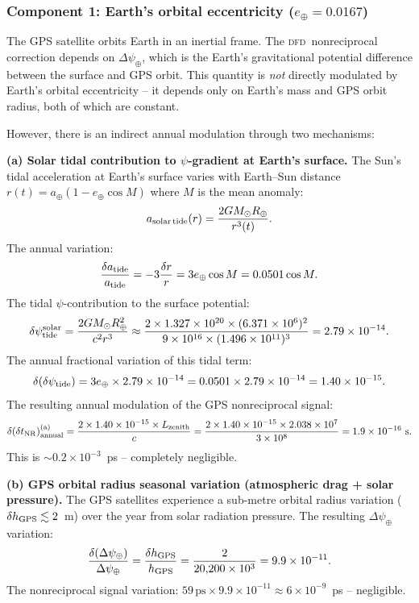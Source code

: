 \documentclass[aps,prd,twocolumn,superscriptaddress,nofootinbib,longbibliography]{revtex4-2}
\newcommand{\DFD}{\textsc{dfd}}
\begin{document}
\subsubsection{Component 1: Earth's orbital eccentricity ($e_\oplus = 0.0167$)}

The GPS satellite orbits Earth in an inertial frame.  The \DFD\ nonreciprocal
correction depends on $\Delta\psi_\oplus$, which is the Earth's gravitational
potential difference between the surface and GPS orbit.  This quantity is
\emph{not} directly modulated by Earth's orbital eccentricity -- it depends
only on Earth's mass and GPS orbit radius, both of which are constant.

However, there is an indirect annual modulation through two mechanisms:

\textbf{(a) Solar tidal contribution to $\psi$-gradient at Earth's surface.}
The Sun's tidal acceleration at Earth's surface varies with Earth--Sun distance
$r(t) = a_\oplus(1 - e_\oplus\cos M)$ where $M$ is the mean anomaly:
\begin{equation}
a_{\rm solar\,tide}(r) = \frac{2GM_\odot R_\oplus}{r^3(t)}.
\end{equation}
The annual variation:
\begin{equation}
\frac{\delta a_{\rm tide}}{a_{\rm tide}} = -3\frac{\delta r}{r} = 3e_\oplus\cos M
= 0.0501\cos M.
\end{equation}
The tidal $\psi$-contribution to the surface potential:
\begin{equation}
\delta\psi_{\rm tide}^{\rm solar} = \frac{2GM_\odot R_\oplus^2}{c^2 r^3}
\approx \frac{2\times1.327\times10^{20}\times(6.371\times10^6)^2}
{9\times10^{16}\times(1.496\times10^{11})^3}
= 2.79\times10^{-14}.
\end{equation}
The annual fractional variation of this tidal term:
\begin{equation}
\delta(\delta\psi_{\rm tide}) = 3e_\oplus \times 2.79\times10^{-14}
= 0.0501\times2.79\times10^{-14} = 1.40\times10^{-15}.
\end{equation}
The resulting annual modulation of the GPS nonreciprocal signal:
\begin{equation}
\delta(\delta t_{\rm NR})_{\rm annual}^{\rm (a)}
= \frac{2\times1.40\times10^{-15}\times L_{\rm zenith}}{c}
= \frac{2\times1.40\times10^{-15}\times2.038\times10^7}{3\times10^8}
= 1.9\times10^{-16}\ \si{s}.
\end{equation}
This is $\sim 0.2\times10^{-3}$~ps -- completely negligible.

\textbf{(b) GPS orbital radius seasonal variation (atmospheric drag + solar pressure).}
The GPS satellites experience a sub-metre orbital radius variation
($\delta h_{\rm GPS}\lesssim 2$~m) over the year from solar radiation pressure.
The resulting $\Delta\psi_\oplus$ variation:
\begin{equation}
\frac{\delta(\Delta\psi_\oplus)}{\Delta\psi_\oplus}
= \frac{\delta h_{\rm GPS}}{h_{\rm GPS}} = \frac{2}{20{,}200\times10^3}
= 9.9\times10^{-11}.
\end{equation}
The nonreciprocal signal variation: $59\,\text{ps}\times9.9\times10^{-11}
\approx 6\times10^{-9}$~ps -- negligible.
\end{document}
